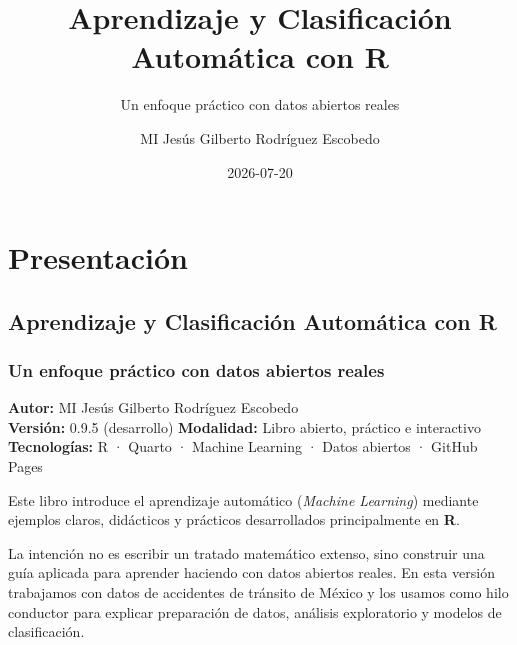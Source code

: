 \documentclass[
  spanish,
  10.5pt,
  letterpaper,
  openany,
  headings=big]{scrbook}
\title{Aprendizaje y Clasificación Automática con R}
\subtitle{Un enfoque práctico con datos abiertos reales}
\author{MI Jesús Gilberto Rodríguez Escobedo}
\date{2026-07-20}
\renewcommand{\contentsname}{Índice general}
\renewcommand*\contentsname{Tabla de contenidos}
\newcommand\contentsname{Tabla de contenidos}
\begin{document}
\frontmatter
\maketitle

\renewcommand*\contentsname{Índice general}
{
\setcounter{tocdepth}{2}
\tableofcontents
}

\mainmatter
{}

\chapter*{Presentación}\label{presentaciuxf3n}


\section*{Aprendizaje y Clasificación Automática con
R}\label{aprendizaje-y-clasificaciuxf3n-automuxe1tica-con-r}


\subsection*{Un enfoque práctico con datos abiertos
reales}\label{un-enfoque-pruxe1ctico-con-datos-abiertos-reales}

\textbf{Autor:} MI Jesús Gilberto Rodríguez Escobedo\\
\textbf{Versión:} 0.9.5 (desarrollo) \textbf{Modalidad:} Libro abierto,
práctico e interactivo\\
\textbf{Tecnologías:} R · Quarto · Machine Learning · Datos abiertos ·
GitHub Pages

Este libro introduce el aprendizaje automático (\emph{Machine Learning})
mediante ejemplos claros, didácticos y prácticos desarrollados
principalmente en \textbf{R}.

La intención no es escribir un tratado matemático extenso, sino
construir una guía aplicada para aprender haciendo con datos abiertos
reales. En esta versión trabajamos con datos de accidentes de tránsito
de México y los usamos como hilo conductor para explicar preparación de
datos, análisis exploratorio y modelos de clasificación.
\end{document}
